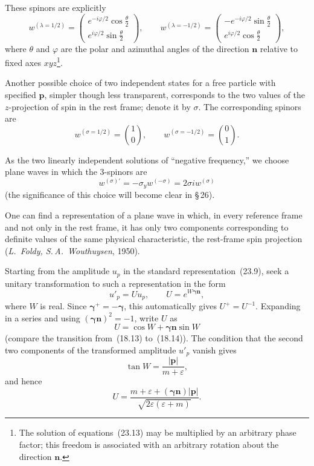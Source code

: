 These spinors are explicitly
\begin{equation}
w^{(\lambda = 1/2)} = \begin{pmatrix} e^{-i\varphi/2}\cos\frac{\theta}{2}\\ e^{i\varphi/2}\sin\frac{\theta}{2} \end{pmatrix},\qquad w^{(\lambda = -1/2)} = \begin{pmatrix} -e^{-i\varphi/2}\sin\frac{\theta}{2}\\ e^{i\varphi/2}\cos\frac{\theta}{2} \end{pmatrix},
\tag{23.14}
\end{equation}
where $\theta$ and $\varphi$ are the polar and azimuthal angles of the direction $\mathbf{n}$ relative to fixed axes $xyz$\footnote{The solution of equations~(23.13) may be multiplied by an arbitrary phase factor; this freedom is associated with an arbitrary rotation about the direction $\mathbf{n}$.}.

Another possible choice of two independent states for a free particle with specified $\mathbf{p}$, simpler though less transparent, corresponds to the two values of the $z$-projection of spin in the rest frame; denote it by $\sigma$. The corresponding spinors are
\begin{equation}
w^{(\sigma = 1/2)} = \binom{1}{0},\qquad w^{(\sigma = -1/2)} = \binom{0}{1}.
\tag{23.15}
\end{equation}

As the two linearly independent solutions of ``negative frequency,'' we choose plane waves in which the 3-spinors are
\begin{equation}
w^{(\sigma)\prime} = -\sigma_y w^{(-\sigma)} = 2\sigma i w^{(\sigma)}
\tag{23.16}
\end{equation}
(the significance of this choice will become clear in \S\,26).

One can find a representation of a plane wave in which, in every reference frame and not only in the rest frame, it has only two components corresponding to definite values of the same physical characteristic, the rest-frame spin projection (\emph{L.~Foldy, S.\,A.~Wouthuysen}, 1950).

Starting from the amplitude $u_p$ in the standard representation~(23.9), seek a unitary transformation to such a representation in the form
\[
u'_p = Uu_p,\qquad U = e^{W\boldsymbol{\gamma}\mathbf{n}},
\]
where $W$ is real. Since $\boldsymbol{\gamma}^+ = -\boldsymbol{\gamma}$, this automatically gives $U^+ = U^{-1}$. Expanding in a series and using $(\boldsymbol{\gamma}\mathbf{n})^2 = -1$, write $U$ as
\[
U = \cos W + \boldsymbol{\gamma}\mathbf{n}\sin W
\]
(compare the transition from~(18.13) to~(18.14)). The condition that the second two components of the transformed amplitude $u'_p$ vanish gives
\[
\tan W = \frac{|\mathbf{p}|}{m + \varepsilon},
\]
and hence
\[
U = \frac{m + \varepsilon + (\boldsymbol{\gamma}\mathbf{n})|\mathbf{p}|}{\sqrt{2\varepsilon(\varepsilon + m)}}.
\]

